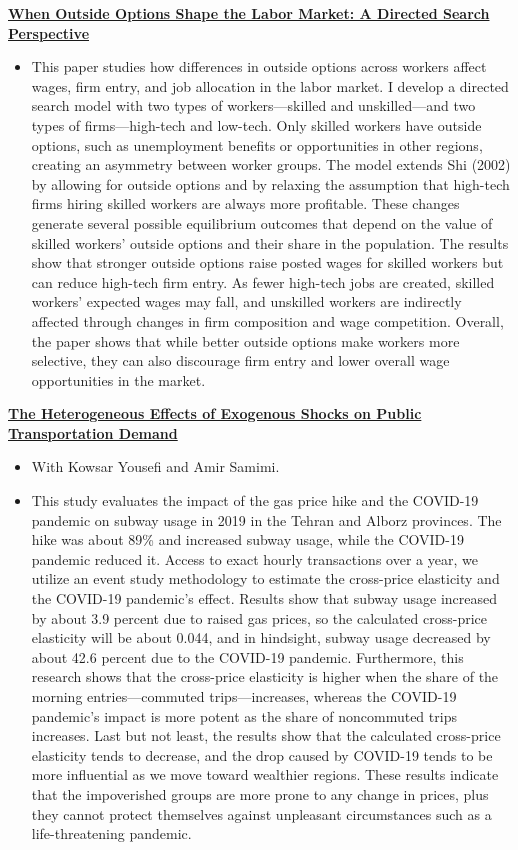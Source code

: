 \documentclass[11pt]{article}
\newcommand{\paper}[1]{\needspace{3\baselineskip}\textbf{#1}\par\vspace{0.15em}}
\newenvironment{desc}
  {\begin{itemize}[leftmargin=1.2em,topsep=0.1em,itemsep=0.15em,parsep=0pt]}
  {\end{itemize}\vspace{0.5em}}
\begin{document}
\paper{\href{https://dx.doi.org/10.2139/ssrn.6379739}{When Outside Options Shape the Labor Market: A Directed Search Perspective}}
\begin{desc}
  \item This paper studies how differences in outside options across workers affect wages, firm entry, and
  job allocation in the labor market. I develop a directed search model with two types of
  workers---skilled and unskilled---and two types of firms---high-tech and low-tech. Only skilled
  workers have outside options, such as unemployment benefits or opportunities in other regions,
  creating an asymmetry between worker groups. The model extends Shi (2002) by allowing for outside
  options and by relaxing the assumption that high-tech firms hiring skilled workers are always more
  profitable. These changes generate several possible equilibrium outcomes that depend on the value
  of skilled workers' outside options and their share in the population. The results show that
  stronger outside options raise posted wages for skilled workers but can reduce high-tech firm
  entry. As fewer high-tech jobs are created, skilled workers' expected wages may fall, and
  unskilled workers are indirectly affected through changes in firm composition and wage
  competition. Overall, the paper shows that while better outside options make workers more
  selective, they can also discourage firm entry and lower overall wage opportunities in the market.
\end{desc}

\paper{\href{https://dx.doi.org/10.2139/ssrn.4830956}{The Heterogeneous Effects of Exogenous Shocks on Public Transportation Demand}}
\begin{desc}
  \item With Kowsar Yousefi and Amir Samimi.
  \item This study evaluates the impact of the gas price hike and the COVID-19 pandemic on subway usage in
  2019 in the Tehran and Alborz provinces. The hike was about 89\% and increased subway usage, while
  the COVID-19 pandemic reduced it. Access to exact hourly transactions over a year, we utilize an
  event study methodology to estimate the cross-price elasticity and the COVID-19 pandemic's effect.
  Results show that subway usage increased by about 3.9 percent due to raised gas prices, so the
  calculated cross-price elasticity will be about 0.044, and in hindsight, subway usage decreased by
  about 42.6 percent due to the COVID-19 pandemic. Furthermore, this research shows that the
  cross-price elasticity is higher when the share of the morning entries---commuted
  trips---increases, whereas the COVID-19 pandemic's impact is more potent as the share of
  noncommuted trips increases. Last but not least, the results show that the calculated cross-price
  elasticity tends to decrease, and the drop caused by COVID-19 tends to be more influential as we
  move toward wealthier regions. These results indicate that the impoverished groups are more prone
  to any change in prices, plus they cannot protect themselves against unpleasant circumstances such
  as a life-threatening pandemic.
\end{desc}
\end{document}
